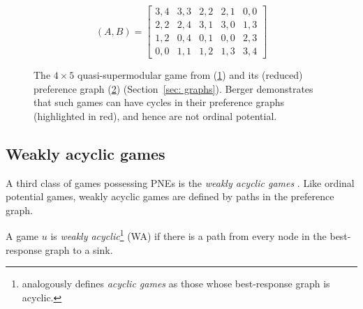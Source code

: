 \documentclass[preprint,authoryear]{elsarticle}
\begin{document}
\begin{figure}
    \centering
    \begin{subfigure}{.45\textwidth}
        \centering
        \begin{equation*}
            (A,B) = \begin{bmatrix}
                3,4 & 3,3 & 2,2 & 2,1 & 0,0 \\
                2,2 & 2,4 & 3,1 & 3,0 & 1,3 \\
                1,2 & 0,4 & 0,1 & 0,0 & 2,3 \\
                0,0 & 1,1 & 1,2 & 1,3 & 3,4
            \end{bmatrix}
        \end{equation*}
        \caption{}
        \label{fig:berger matrixl}
    \end{subfigure}
    \quad
    \begin{subfigure}{.45\textwidth}
        \centering
        
        \caption{}
        \label{fig:berger graph}
    \end{subfigure}
    \caption{The $4\times 5$ quasi-supermodular game from \cite[pg. 12]{berger_two_2007} (\ref{fig:berger matrixl}) and its (reduced) preference graph (\ref{fig:berger graph}) (Section~\ref{sec: graphs}). Berger demonstrates that such games can have cycles in their preference graphs (highlighted in red), and hence are not ordinal potential.}
    \label{fig:berger counter}
\end{figure}

\subsection{Weakly acyclic games} \label{sec: weakly acyclic}


A third class of games possessing PNEs is the \emph{weakly acyclic games} \citep{young_evolution_1993}. Like ordinal potential games, weakly acyclic games are defined by paths in the preference graph.%

\begin{defn}
    A game $u$ is \emph{weakly acyclic}\footnote{\cite{young_evolution_1993} analogously defines \emph{acyclic games} as those whose best-response graph is acyclic.} (WA) if there is a path from every node in the best-response graph to a sink.
\end{defn}
\end{document}
